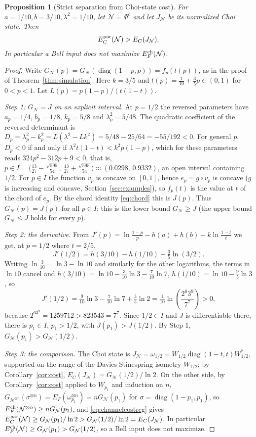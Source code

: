 \documentclass[11pt]{article}
\newtheorem{proposition}[theorem]{Proposition}
\begin{document}
\begin{proposition}[Strict separation from Choi-state cost]\label{prop:choigap}
For $a=1/10,b=3/10,\lambda^2=1/10$, let $\mathcal N=\Phi^c$ and let
$J_{\mathcal N}$ be its normalized Choi state. Then
\[
 E_C^{\rm par}(\mathcal N)>E_C(J_{\mathcal N}).
\]
In particular a Bell input does not maximize $E_F^{\rm ch}(\mathcal N)$.
\end{proposition}
\begin{proof}
Write $G_{\mathcal N}(p)=G_{\mathcal N}(\operatorname{diag}(1-p,p))=f_p(t(p))$, as in the proof of Theorem~\ref{thm:simulation}. Here $k=3/5$ and $t(p)=\tfrac1{10}+\tfrac35p\in(0,1)$ for $0<p<1$. Let $L(p)=p(1-p)/(t(1-t))$.

\emph{Step 1: $G_{\mathcal N}=J$ on an explicit interval.} At $p=1/2$ the reversed parameters have $a_p=1/4$, $b_p=1/8$,
$k_p=5/8$ and $\lambda_p^2=5/48$. The quadratic coefficient of the reversed determinant is
$D_p=\lambda_p^2-k_p^2=L(\lambda^2-Lk^2)=5/48-25/64=-55/192<0$. For general $p$, $D_p<0$ if and only if $\lambda^2t(1-t)<k^2p(1-p)$, which for these parameters reads $324p^2-312p+9<0$, that is,
$p\in I=\bigl(\tfrac{13}{27}-\tfrac{\sqrt{595}}{54},\ \tfrac{13}{27}+\tfrac{\sqrt{595}}{54}\bigr)\approx(0.0298,\,0.9332)$, an open interval containing $1/2$. For $p\in I$ the function $v_p$ is concave on $[0,1]$, hence $e_p=g\circ v_p$ is concave ($g$ is increasing and concave, Section~\ref{sec:examples}), so $f_p(t)$ is the value at $t$ of the chord of $e_p$. By the chord identity \eqref{eq:chord} this is $J(p)$. Thus $G_{\mathcal N}(p)=J(p)$ for all $p\in I$; this is the lower bound $G_{\mathcal N}\ge J$ (the upper bound $G_{\mathcal N}\le J$ holds for every $p$).

\emph{Step 2: the derivative.} From $J'(p)=\ln\frac{1-p}p-h(a)+h(b)-k\ln\frac{1-t}t$ we get, at $p=1/2$ where $t=2/5$,
\[
 J'(1/2)=h(3/10)-h(1/10)-\tfrac35\ln(3/2).
\]
Writing $\ln\frac3{10}=\ln3-\ln10$ and similarly for the other logarithms, the terms in $\ln10$ cancel and $h(3/10)=\ln10-\tfrac3{10}\ln3-\tfrac7{10}\ln7$, $h(1/10)=\ln10-\tfrac9{5}\ln3$, so
\[
 J'(1/2)=\tfrac{9}{10}\ln3-\tfrac7{10}\ln7+\tfrac35\ln2
 =\tfrac1{10}\ln\left(\frac{2^6 3^9}{7^7}\right)>0,
\]
because $2^63^9=1259712>823543=7^7$. Since $1/2\in I$ and $J$ is differentiable there, there is $p_1\in I$, $p_1>1/2$, with $J(p_1)>J(1/2)$. By Step 1, $G_{\mathcal N}(p_1)>G_{\mathcal N}(1/2)$.

\emph{Step 3: the comparison.} The Choi state is $J_{\mathcal N}=\omega_{1/2}=W_{1/2}\operatorname{diag}(1-t,t)W_{1/2}^*$, supported on the range of the Davies Stinespring isometry $W_{1/2}$; by Corollary~\ref{cor:cost}, $E_C(J_{\mathcal N})=G_{\mathcal N}(1/2)/\ln2$. On the other side, by Corollary~\ref{cor:cost} applied to $W_{p_1}$ and induction on $n$, $G_{\mathcal N^{\otimes n}}(\sigma^{\otimes n})=E_F(\omega_{p_1}^{\otimes n})=nG_{\mathcal N}(p_1)$ for $\sigma=\operatorname{diag}(1-p_1,p_1)$, so $E_F^{\rm ch}(\mathcal N^{\otimes n})\ge nG_{\mathcal N}(p_1)$, and \eqref{eq:channelcostreg} gives $E_C^{\rm par}(\mathcal N)\ge G_{\mathcal N}(p_1)/\ln2>G_{\mathcal N}(1/2)/\ln2=E_C(J_{\mathcal N})$. In particular $E_F^{\rm ch}(\mathcal N)\ge G_{\mathcal N}(p_1)>G_{\mathcal N}(1/2)$, so a Bell input does not maximize.
\end{proof}
\end{document}
